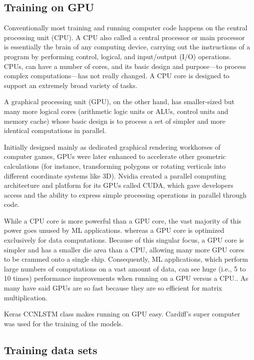 \subsection{Training on GPU}

Conventionally most training and running computer code happens on the central
processing unit (CPU). A CPU also called a central processor or main processor
is essentially the brain of any computing device, carrying out the instructions
of a program by performing control, logical, and input/output (I/O) operations.
CPUs, can have a number of cores, and its basic design and purpose—to process
complex computations—has not really changed. A CPU core is designed to support
an extremely broad variety of tasks.

A graphical processing unit (GPU), on the other hand, has smaller-sized but many
more logical cores (arithmetic logic units or ALUs, control units and memory
cache) whose basic design is to process a set of simpler and more identical
computations in parallel.

Initially designed mainly as dedicated graphical rendering workhorses of
computer games, GPUs were later enhanced to accelerate other geometric
calculations (for instance, transforming polygons or rotating verticals into
different coordinate systems like 3D). Nvidia created a parallel computing
architecture and platform for its GPUs called CUDA, which gave developers access
and the ability to express simple processing operations in parallel through
code.

While a CPU core is more powerful than a GPU core, the vast majority of this
power goes unused by ML applications. whereas a GPU core is optimized
exclusively for data computations. Because of this singular focus, a GPU core is
simpler and has a smaller die area than a CPU, allowing many more GPU cores to
be crammed onto a single chip. Consequently, ML applications, which perform
large numbers of computations on a vast amount of data, can see huge (i.e., 5 to
10 times) performance improvements when running on a GPU versus a CPU..
As many have said GPUs are so fast because they are so efficient for matrix
multiplication.

Keras CCNLSTM class makes running on GPU easy. Cardiff's super computer
was used for the training of the models.

\subsection{Training data sets}

